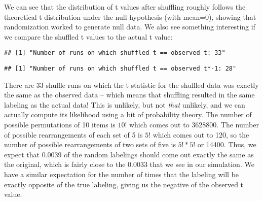 \documentclass[]{book}
\newenvironment{Shaded}{\begin{snugshade}}{\end{snugshade}}
\newcommand{\KeywordTok}[1]{\textcolor[rgb]{0.13,0.29,0.53}{\textbf{#1}}}
\newcommand{\DecValTok}[1]{\textcolor[rgb]{0.00,0.00,0.81}{#1}}
\newcommand{\StringTok}[1]{\textcolor[rgb]{0.31,0.60,0.02}{#1}}
\newcommand{\CommentTok}[1]{\textcolor[rgb]{0.56,0.35,0.01}{\textit{#1}}}
\newcommand{\OperatorTok}[1]{\textcolor[rgb]{0.81,0.36,0.00}{\textbf{#1}}}
\newcommand{\NormalTok}[1]{#1}
\theoremstyle{definition}
\theoremstyle{definition}
\theoremstyle{definition}
\theoremstyle{remark}
\begin{document}
We can see that the distribution of t values after shuffling roughly
follows the theoretical t distribution under the null hypothesis (with
mean=0), showing that randomization worked to generate null data. We
also see something interesting if we compare the shuffled t values to
the actual t value:

\begin{Shaded}
\end{Shaded}

\begin{verbatim}
## [1] "Number of runs on which shuffled t == observed t: 33"
\end{verbatim}

\begin{Shaded}
\end{Shaded}

\begin{verbatim}
## [1] "Number of runs on which shuffled t == observed t*-1: 28"
\end{verbatim}

There are 33 shuffle runs on which the t statistic for the shuffled data
was exactly the same as the observed data -- which means that shuffling
resulted in the same labeling as the actual data! This is unlikely, but
not \emph{that} unlikely, and we can actually compute its likelihood
using a bit of probability theory. The number of possible permutations
of 10 items is \(10!\) which comes out to 3628800. The number of
possible rearrangements of each set of 5 is \(5!\) which comes out to
120, so the number of possible rearrangements of two sets of five is
\(5! * 5!\) or 14400. Thus, we expect that 0.0039 of the random
labelings should come out exactly the same as the original, which is
fairly close to the 0.0033 that we see in our simulation. We have a
similar expectation for the number of times that the labeling will be
exactly opposite of the true labeling, giving us the negative of the
observed t value.
\end{document}
